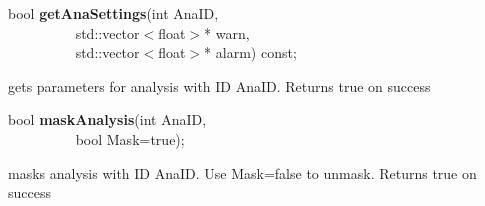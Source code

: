 \item    bool {\bf getAnaSettings}(int AnaID,\\\mbox{}~~~~~~~~~
		      std::vector$<$float$>$* warn,\\\mbox{}~~~~~~~~~ 
		      std::vector$<$float$>$* alarm) const;

 gets parameters for analysis with ID AnaID. Returns true on success


\item    bool {\bf maskAnalysis}(int AnaID,\\\mbox{}~~~~~~~~~
		    bool Mask=true);

 masks analysis with ID AnaID. Use Mask=false to unmask. Returns true on success


